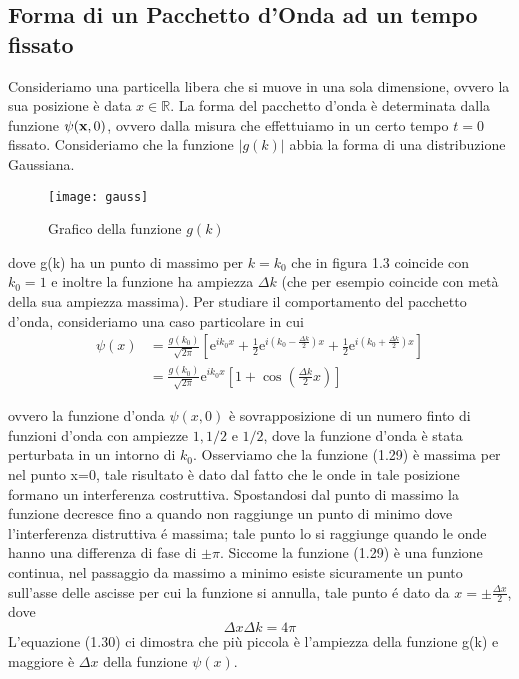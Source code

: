 \subsection{Forma di un Pacchetto d'Onda ad un tempo fissato}

Consideriamo una particella libera che si muove in una sola dimensione, ovvero la sua posizione \`e data $x \in \mathbb{R}$. La forma del pacchetto d'onda \`e determinata dalla funzione $\psi(\bold{x},0)$, ovvero dalla misura che effettuiamo in un certo tempo $t=0$ fissato. Consideriamo che la funzione $|g(k)|$ abbia la forma di una distribuzione Gaussiana.

 
\begin{figure}[ht]
\vspace{0.1in}
\texttt{[image: gauss]}	
\centering
\vspace{0.1in}
\caption{Grafico della funzione $g(k)$}
\end{figure}

\noindent dove g(k) ha un punto di massimo per $k = k_0$ che in figura 1.3 coincide con $k_0 = 1$ e inoltre la funzione ha ampiezza $\Delta k$ (che per esempio coincide con met\`a della sua ampiezza massima).
Per studiare il comportamento del pacchetto d'onda, consideriamo una caso particolare in cui
\begin{equation}
	\begin{aligned}
\psi(x) & =\frac{g\left(k_0\right)}{\sqrt{2 \pi}}\left[\mathrm{e}^{i k_0 x}+\frac{1}{2} \mathrm{e}^{i\left(k_0-\frac{\Delta k}{2}\right) x}+\frac{1}{2} \mathrm{e}^{i\left(k_0+\frac{\Delta k}{2}\right) x}\right] \\[0.5cm]
& =\frac{g\left(k_0\right)}{\sqrt{2 \pi}} \mathrm{e}^{i k_0 x}\left[1+\cos \left(\frac{\Delta k}{2} x\right)\right]
\end{aligned}
\end{equation}

ovvero la funzione d'onda $\psi(x,0)$ \`e sovrapposizione di un numero finto di funzioni d'onda con ampiezze $1, 1/2$ e $1/2$, dove la funzione d'onda \`e stata perturbata in un intorno di $k_0$. Osserviamo che la funzione (1.29) \`e massima per nel punto x=0, tale risultato \`e dato dal fatto che le onde in tale posizione formano un interferenza costruttiva. Spostandosi dal punto di massimo la funzione decresce fino a quando non raggiunge un punto di minimo dove l'interferenza distruttiva \'e massima; tale punto lo si raggiunge quando le onde hanno una differenza di fase di $\pm \pi$. Siccome la funzione (1.29) \`e una funzione continua, nel passaggio da massimo a minimo esiste sicuramente un punto sull'asse delle ascisse per cui la funzione si annulla, tale punto \'e dato da $x = \pm \frac{\Delta x}{2}$, dove 
\begin{equation}
	\Delta x \Delta k = 4 \pi
\end{equation}
L'equazione (1.30) ci dimostra che pi\`u piccola \`e l'ampiezza della funzione g(k) e maggiore \`e $\Delta x$ della funzione $\psi(x)$.
\newline

